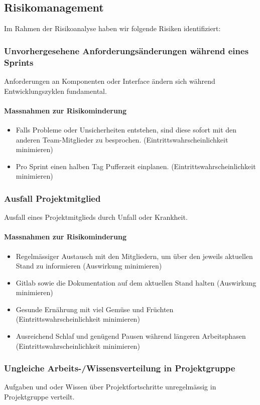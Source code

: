 \documentclass[11pt]{article}
\begin{document}
\subsection{Risikomanagement}
Im Rahmen der Risikoanalyse haben wir folgende Risiken identifiziert:
\subsubsection{Unvorhergesehene Anforderungsänderungen während eines Sprints}
Anforderungen an Komponenten oder Interface ändern sich während Entwicklungszyklen fundamental.
\paragraph{Massnahmen zur Risikominderung}
\begin{itemize}
\item Falls Probleme oder Unsicherheiten entstehen, sind diese sofort mit den anderen Team-Mitglieder zu besprochen. (Eintrittswahrscheinlichkeit minimieren)
\item Pro Sprint einen halben Tag Pufferzeit einplanen. (Eintrittswahrscheinlichkeit minimieren)
\end{itemize}

\subsubsection{Ausfall Projektmitglied}
Ausfall eines Projektmitglieds durch Unfall oder Krankheit.
\paragraph{Massnahmen zur Risikominderung}
\begin{itemize}
\item Regelmässiger Austausch mit den Mitgliedern, um über den jeweils aktuellen Stand zu informieren (Auswirkung minimieren)
\item Gitlab sowie die Dokumentation auf dem aktuellen Stand halten (Auswirkung minimieren)
\item Gesunde Ernährung mit viel Gemüse und Früchten (Eintrittswahrscheinlichkeit minimieren)
\item Ausreichend Schlaf und genügend Pausen während längeren Arbeitsphasen (Eintrittswahrscheinlichkeit minimieren)
\end{itemize}
\subsubsection{Ungleiche Arbeits-/Wissensverteilung in Projektgruppe}
Aufgaben und oder Wissen über Projektfortschritte unregelmässig in Projektgruppe verteilt.
\end{document}

